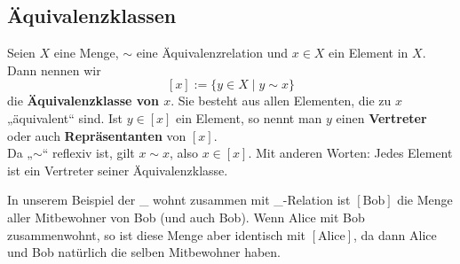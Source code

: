 \subsection{Äquivalenzklassen}
\begin{de}
	Seien $X$ eine Menge, $\sim$ eine Äquivalenzrelation und $x\in X$ ein Element in $X$. Dann nennen wir
		\[[ x ] := \{ y\in X \mid y\sim x \}\]
	die \textbf{Äquivalenzklasse von $x$}. Sie besteht aus allen Elementen, die zu $x$ „äquivalent“ sind. Ist $y\in[x]$ ein Element, so nennt man $y$ einen \textbf{Vertreter} oder auch \textbf{Repräsentanten} von $[x]$. \\[0.5em]
Da „$\sim$“ reflexiv ist, gilt $x\sim x$, also $x\in [x]$. Mit anderen Worten: Jedes Element ist ein Vertreter seiner Äquivalenzklasse.
\end{de}
\begin{bsp}
	In unserem Beispiel der \glqq\_ wohnt zusammen mit \_\grqq-Relation ist $[
	\text{Bob} ]$ die Menge aller Mitbewohner von Bob (und auch Bob). Wenn Alice mit Bob zusammenwohnt, so ist diese
	Menge aber identisch mit $[ \text{Alice} ]$, da dann Alice und Bob
	natürlich die selben Mitbewohner haben.
\end{bsp}




